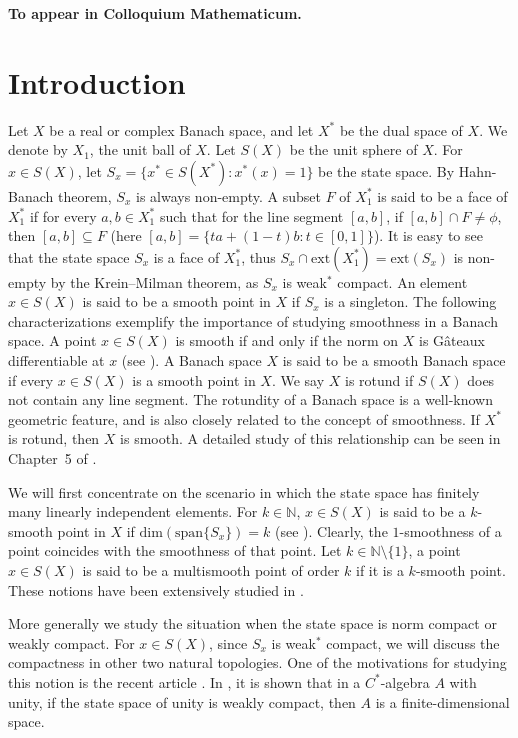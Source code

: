 \documentclass[12pt]{amsart}
\theoremstyle{definition}
\numberwithin{equation}{section}
\begin{document}
\maketitle
\textbf{To appear in Colloquium Mathematicum.}
\section{Introduction}
Let $X$ be a real or complex Banach space, and let $X^*$ be the dual space of $X$. We denote by $X_1$, the unit ball of $X$. Let $S(X)$ be the unit sphere of $X$. For $x\in S(X)$, let $S_x=\{x^*\in S(X^*):x^*(x)=1\}$ be the state space. By Hahn-Banach theorem, $S_x$ is always non-empty. A subset $F$ of $X_1^*$ is said to be a face of $X_1^*$ if for every $a,b\in X_1^*$ such that for the line segment $[a,b]$, if $[a,b]\cap F\neq \phi$, then $[a,b]\subseteq F$ (here $[a,b]=\{ta+(1-t)b:t\in [0,1]\}$). It is easy to see that the state space $S_{x}$ is a face of $X_{1}^*$, thus $S_{x}\cap\text{ext}(X_{1}^*)=\text{ext}(S_{x})$ is non-empty by the Krein--Milman theorem, as $S_x$ is weak$^*$ compact. An element $x\in S(X)$ is said to be a smooth point in $X$ if $S_x$ is a singleton. The following characterizations exemplify the importance of studying smoothness in a Banach space. A point $x\in S(X)$ is smooth if and only if the norm on $X$ is G\^ateaux differentiable at $x$ (see \cite[Theorem~5.4.17]{M}). A Banach space $X$ is said to be a smooth Banach space if every $x\in S(X)$ is a smooth point in $X$. We say $X$ is rotund if $S(X)$ does not contain any line segment. The rotundity of a Banach space is a well-known geometric feature, and is also closely related to the concept of smoothness. If $X^*$ is rotund, then $X$ is smooth. A detailed study of this relationship can be seen in Chapter~5 of \cite{M}.

We will first concentrate on the scenario in which the state space has finitely many linearly independent elements. For $k\in \mathbb{N}$, $x\in S(X)$ is said to be a $k$-smooth point in $X$ if $\text{dim}(\text{span}\{S_x\})=k$ (see \cite{LR}). Clearly, the $1$-smoothness of a point coincides with the smoothness of that point. Let $k\in \mathbb{N}\setminus \{1\}$, a point $x\in S(X)$ is said to be a multismooth point of order $k$ if it is a $k$-smooth point. These notions have been extensively studied in \cite{DK, KS, LR}. 

More generally we study the situation when the state space is norm compact or weakly compact. For $x\in S(X)$, since $S_x$ is weak$^*$ compact, we will discuss the compactness in other two natural topologies. One of the motivations for studying this notion is the recent article \cite{R1}. In \cite{R1}, it is shown that in a $C^*$-algebra $A$ with unity, if the state space of unity is weakly compact, then $A$ is a finite-dimensional space.
\end{document}
